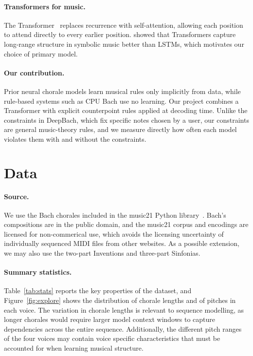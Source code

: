 \documentclass{article}
\begin{document}
\paragraph{Transformers for music.} The Transformer~\cite{vaswani2017attention} replaces recurrence with self-attention, allowing each position to attend directly to every earlier position. \citet{huang2019music} showed that Transformers capture long-range structure in symbolic music better than LSTMs, which motivates our choice of primary model.

\paragraph{Our contribution.} Prior neural chorale models learn musical rules only implicitly from data, while rule-based systems such as CPU Bach use no learning. Our project combines a Transformer with explicit counterpoint rules applied at decoding time. Unlike the constraints in DeepBach, which fix specific notes chosen by a user, our constraints are general music-theory rules, and we measure directly how often each model violates them with and without the constraints.

\section{Data}

\paragraph{Source.} We use the Bach chorales included in the music21 Python library~\cite{cuthbert2010music21}. Bach's compositions are in the public domain, and the music21 corpus and encodings are licensed for non-commerical use, which avoids the licensing uncertainty of individually sequenced MIDI files from other websites. As a possible extension, we may also use the two-part Inventions and three-part Sinfonias.

\paragraph{Summary statistics.} Table~\ref{tab:stats} reports the key properties of the dataset, and Figure~\ref{fig:explore} shows the distribution of chorale lengths and of pitches in each voice. The variation in chorale lengths is relevant to sequence modelling, as longer chorales would require larger model context windows to capture dependencies across the entire sequence. Additionally, the different pitch ranges of the four voices may contain voice specific characteristics that must be accounted for when learning musical structure.
\end{document}
